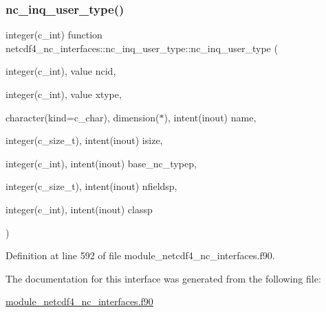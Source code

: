 \subsubsection{\texorpdfstring{nc\+\_\+inq\+\_\+user\+\_\+type()}{nc\_inq\_user\_type()}}
{\footnotesize\ttfamily integer(c\+\_\+int) function netcdf4\+\_\+nc\+\_\+interfaces\+::nc\+\_\+inq\+\_\+user\+\_\+type\+::nc\+\_\+inq\+\_\+user\+\_\+type (\begin{DoxyParamCaption}\item[{integer(c\+\_\+int), value}]{ncid,  }\item[{integer(c\+\_\+int), value}]{xtype,  }\item[{character(kind=c\+\_\+char), dimension($\ast$), intent(inout)}]{name,  }\item[{integer(c\+\_\+size\+\_\+t), intent(inout)}]{isize,  }\item[{integer(c\+\_\+int), intent(inout)}]{base\+\_\+nc\+\_\+typep,  }\item[{integer(c\+\_\+size\+\_\+t), intent(inout)}]{nfieldsp,  }\item[{integer(c\+\_\+int), intent(inout)}]{classp }\end{DoxyParamCaption})}



Definition at line 592 of file module\+\_\+netcdf4\+\_\+nc\+\_\+interfaces.\+f90.



The documentation for this interface was generated from the following file\+:\begin{DoxyCompactItemize}
\item 
\hyperlink{module__netcdf4__nc__interfaces_8f90}{module\+\_\+netcdf4\+\_\+nc\+\_\+interfaces.\+f90}\end{DoxyCompactItemize}
